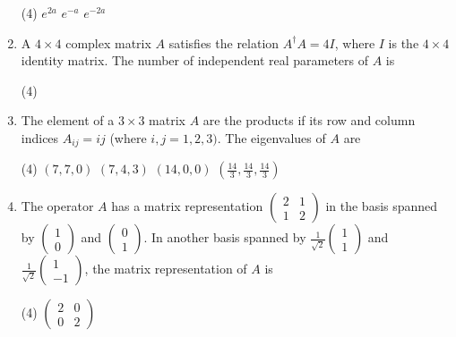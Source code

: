 \begin{enumerate}[label=\color{ocre}\textbf{\arabic*.}]
	{}
	\begin{tasks}(4)
		\task[\textbf{A.}] $e^{2 a}$
		\task[\textbf{B.}] $e^{-a}$
		\task[\textbf{C.}]  $e^{-2 a}$
	\end{tasks}
	\item A $4 \times 4$ complex matrix $A$ satisfies the relation $A^{\dagger} A=4 I$, where $I$ is the $4 \times 4$ identity matrix. The number of independent real parameters of $A$ is
	{}
	\begin{tasks}(4)
	\end{tasks}
	\item  The element of a $3 \times 3$ matrix $A$ are the products if its row and column indices $A_{i j}=i j$ (where $i, j=1,2,3)$. The eigenvalues of $A$ are
	{}
	\begin{tasks}(4)
		\task[\textbf{A.}] $(7,7,0)$
		\task[\textbf{B.}]  $(7,4,3)$
		\task[\textbf{C.}] $(14,0,0)$
		\task[\textbf{D.}] $\left(\frac{14}{3}, \frac{14}{3}, \frac{14}{3}\right)$
	\end{tasks}
	\item  The operator $A$ has a matrix representation $\left(\begin{array}{ll}2 & 1 \\ 1 & 2\end{array}\right)$ in the basis spanned by $\left(\begin{array}{l}1 \\ 0\end{array}\right)$ and $\left(\begin{array}{l}0 \\ 1\end{array}\right) .$ In another basis spanned by $\frac{1}{\sqrt{2}}\left(\begin{array}{l}1 \\ 1\end{array}\right)$ and $\frac{1}{\sqrt{2}}\left(\begin{array}{c}1 \\ -1\end{array}\right)$, the matrix representation of $A$ is
	{}
	\begin{tasks}(4)
		\task[\textbf{A.}] $\left(\begin{array}{ll}2 & 0 \\ 0 & 2\end{array}\right)$

\end{tasks}
\end{enumerate}
